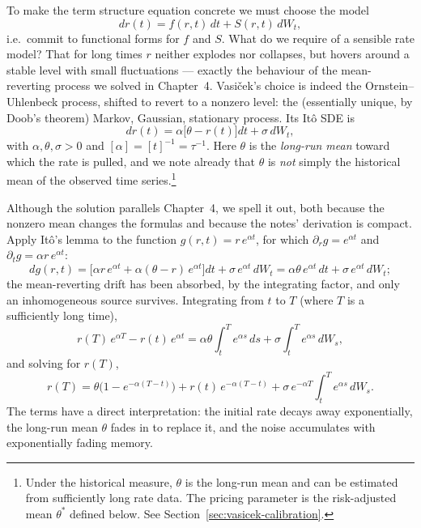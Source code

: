 To make the term structure equation concrete we must choose the model
\begin{equation}\label{eq:vasicek-sde}
dr(t) = f(r,t)\, dt + S(r,t)\, dW_t,
\end{equation}
i.e.\ commit to functional forms for $f$ and $S$.
What do we require of a sensible rate model?
That for long times $r$ neither explodes nor collapses, but hovers around a stable level with small fluctuations --- exactly the behaviour of the mean-reverting process we solved in Chapter~4.
Vasi\v{c}ek's choice is indeed the Ornstein--Uhlenbeck process\cite{UhlenbeckOrnstein1930}, shifted to revert to a nonzero level: the (essentially unique, by Doob's theorem) Markov, Gaussian, stationary process.
Its It\^o SDE is
\begin{equation}\label{eq:ou-rate}
dr(t) = \alpha\bigl[\theta - r(t)\bigr]dt + \sigma\, dW_t,
\end{equation}
with $\alpha, \theta, \sigma > 0$ and $[\alpha] = [t]^{-1} = \tau^{-1}$.
Here $\theta$ is the \emph{long-run mean} toward which the rate is pulled, and we note already that $\theta$ is \emph{not} simply the historical mean of the observed time series.\footnote{Under the historical measure, $\theta$ is the long-run mean and can be estimated from sufficiently long rate data.
The pricing parameter is the risk-adjusted mean $\theta^*$ defined below. See Section~\ref{sec:vasicek-calibration}.}

Although the solution parallels Chapter~4, we spell it out, both because the nonzero mean changes the formulas and because the notes' derivation is compact.
Apply It\^o's lemma to the function $g(r,t) = r\, e^{\alpha t}$, for which $\partial_r g = e^{\alpha t}$ and $\partial_t g = \alpha r\, e^{\alpha t}$:
\begin{equation}
dg(r,t) = \bigl[\alpha r\, e^{\alpha t} + \alpha(\theta - r)\, e^{\alpha t}\bigr]dt + \sigma\, e^{\alpha t}\, dW_t = \alpha\theta\, e^{\alpha t}\, dt + \sigma\, e^{\alpha t}\, dW_t;
\end{equation}
the mean-reverting drift has been absorbed, by the integrating factor, and only an inhomogeneous source survives.
Integrating from $t$ to $T$ (where $T$ is a sufficiently long time),
\begin{equation}
r(T)\, e^{\alpha T} - r(t)\, e^{\alpha t} = \alpha\theta\int_t^T e^{\alpha s}\, ds + \sigma\int_t^T e^{\alpha s}\, dW_s,
\end{equation}
and solving for $r(T)$,
\begin{equation}\label{eq:ou-solution}
r(T) = \theta\bigl(1 - e^{-\alpha(T-t)}\bigr) + r(t)\, e^{-\alpha(T-t)} + \sigma\, e^{-\alpha T}\int_t^T e^{\alpha s}\, dW_s.
\end{equation}
The terms have a direct interpretation: the initial rate decays away exponentially, the long-run mean $\theta$ fades in to replace it, and the noise accumulates with exponentially fading memory.


